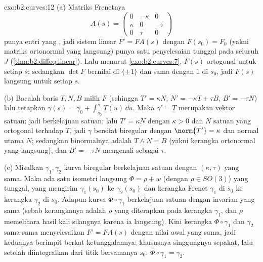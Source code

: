 \begin{solution}{exo:b2:curves:12}
(a) Matriks Frenetnya
\[
A(s) = \begin{pmatrix} 0 & -\kappa & 0\\ \kappa & 0 & -\tau\\
0 & \tau & 0\end{pmatrix}
\]
punya entri yang , jadi sistem linear $F' = FA(s)$ dengan
$F(s_0) = F_0$ (yakni matriks ortonormal yang langsung) punya satu penyelesaian
tunggal pada seluruh $J$ (\cref{thm:b2:diffeq:linear}). Lalu menurut
\cref{exo:b2:curves:7}, $F(s)$ ortogonal untuk setiap $s$;
sedangkan $\det F$  bernilai di $\{\pm1\}$ dan sama dengan
$1$ di $s_0$, jadi $F(s)$ langsung untuk setiap $s$.

(b) Bacalah baris $T, N, B$ milik $F$ (sehingga $T' = \kappa
N$, $N' = -\kappa T + \tau B$, $B' = -\tau N$) lalu tetapkan
$\gamma(s) = \gamma_0 + \int_{s_0}^s T(u)\,\dd u$. Maka
$\gamma' = T$ merupakan vektor satuan: jadi berkelajuan satuan; lalu $T' = \kappa N$
dengan $\kappa > 0$ dan $N$ satuan yang ortogonal terhadap $T$, jadi $\gamma$
bersifat biregular dengan  $\norm{T'} = \kappa$ dan
normal utama $N$; sedangkan binormalnya adalah $T \wedge N = B$
(yakni kerangka ortonormal yang langsung), dan $B' = -\tau N$ mengenali
 sebagai $\tau$.

(c) Misalkan $\gamma_1, \gamma_2$ kurva biregular berkelajuan satuan
dengan $(\kappa, \tau)$ yang sama. Maka ada satu isometri langsung
$\Phi = \rho + w$ (dengan $\rho \in SO(3)$) yang tunggal, yang mengirim
$\gamma_1(s_0)$ ke $\gamma_2(s_0)$ dan kerangka Frenet
$\gamma_1$ di $s_0$ ke kerangka $\gamma_2$ di $s_0$. Adapun kurva
$\Phi\circ\gamma_1$ berkelajuan satuan dengan invarian yang sama
(sebab kerangkanya adalah $\rho$ yang diterapkan pada kerangka $\gamma_1$, dan
$\rho$ memelihara hasil kali silangnya karena ia langsung). Kini
kerangka $\Phi\circ\gamma_1$ dan $\gamma_2$ sama-sama menyelesaikan $F' =
FA(s)$ dengan nilai awal yang sama, jadi keduanya berimpit berkat
ketunggalannya; khususnya singgungnya sepakat, lalu setelah diintegralkan
dari titik bersamanya $s_0$: $\Phi\circ\gamma_1 = \gamma_2$.
\end{solution}

